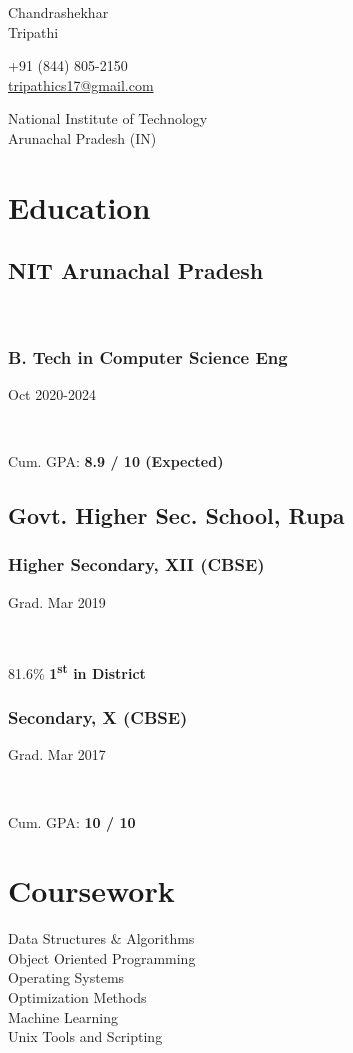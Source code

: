\documentclass[]{article}
\newcommand{\namesection}[3]{
  \begin{multicols}{2}
    \begin{flushleft}
      \fontsize{30pt}{25pt}
      \fontspec[Path = fonts/ZillaSlab/]{ZillaSlab-Light}
      {{ #1 }\\ { #2 }}
      \columnbreak\\
    \end{flushleft}
    \begin{flushright}
      { #3 }
    \end{flushright}
  \end{multicols}
  \vspace{-10pt}
}
\newcommand{\subheading}[2]{
  {\subsection{#1}
  \hfill \normalsize#2} \\
  \vspace{2pt}
}
\newcommand{\subsubheading}[2]{
  {\subsubsection{#1}
  \hfill \small#2} \\
  \vspace{2pt}
}
\begin{document}
\namesection{Chandrashekhar}{Tripathi}{
  +91 (844) 805-2150\\
  \href{mailto:tripathics17@gmail.com}{tripathics17@gmail.com}\par
  National Institute of Technology\\
  Arunachal Pradesh (IN)
}

\noindent\makebox[\linewidth]{\color{headingclr}\rule{\paperwidth}{0.2pt}}
\vspace{-15pt}


\begin{multicols}{2}
  \begin{flushleft}
    
    \section{Education}
    \subheading{NIT Arunachal Pradesh}{}
    \subsubheading{B. Tech in Computer Science Eng}{Oct 2020-2024}
    Cum. GPA: \textbf{8.9 / 10 (Expected)} \\

    \subsection{Govt. Higher Sec. School, Rupa}
    \subsubheading{Higher Secondary, XII (CBSE)}{Grad. Mar 2019}
    81.6\% \textbf{1\textsuperscript{st} in District}

    \subsubheading{Secondary, X (CBSE)}{Grad. Mar 2017}
    Cum. GPA: \textbf{10 / 10} \\
    
    
    \section{Coursework}
    Data Structures \& Algorithms \\
    Object Oriented Programming \\
    Operating Systems \\
    Optimization Methods \\
    Machine Learning \\
    Unix Tools and Scripting \\


\end{flushleft}
\end{multicols}
\end{document}
